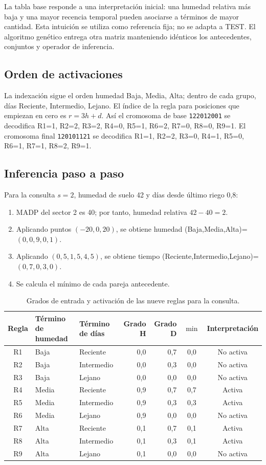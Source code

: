 \documentclass[11pt,letterpaper]{article}
\newcommand{\codigo}[1]{\texttt{\small #1}}
\begin{document}
La tabla base responde a una interpretación inicial: una humedad relativa más baja y una mayor recencia temporal pueden asociarse a términos de mayor cantidad. Esta intuición se utiliza como referencia fija; no se adapta a TEST. El algoritmo genético entrega otra matriz manteniendo idénticos los antecedentes, conjuntos y operador de inferencia.

\subsection{Orden de activaciones}
La indexación sigue el orden humedad Baja, Media, Alta; dentro de cada grupo, días Reciente, Intermedio, Lejano. El índice de la regla para posiciones que empiezan en cero es $r=3h+d$. Así el cromosoma de base \codigo{122012001} se decodifica R1=1, R2=2, R3=2, R4=0, R5=1, R6=2, R7=0, R8=0, R9=1. El cromosoma final \codigo{120101121} se decodifica R1=1, R2=2, R3=0, R4=1, R5=0, R6=1, R7=1, R8=2, R9=1.

\subsection{Inferencia paso a paso}
Para la consulta $s=2$, humedad de suelo 42 y días desde último riego 0,8:
\begin{enumerate}
  \item MADP del sector 2 es 40; por tanto, humedad relativa $42-40=2$.
  \item Aplicando puntos $(-20,0,20)$, se obtiene humedad (Baja,Media,Alta)=$(0,0{,}9,0{,}1)$.
  \item Aplicando $(0{,}5,1{,}5,4{,}5)$, se obtiene tiempo (Reciente,Intermedio,Lejano)=$(0{,}7,0{,}3,0)$.
  \item Se calcula el mínimo de cada pareja antecedente.
\end{enumerate}

\begin{table}[H]
\centering
\caption{Grados de entrada y activación de las nueve reglas para la consulta.}\label{tab:consulta-act}
\begin{tabular}{cllrrcc}
\toprule
Regla & Término de humedad & Término de días & Grado H & Grado D & $\min$ & Interpretación\\
\midrule
R1 & Baja & Reciente & 0,0 & 0,7 & 0,0 & No activa\\
R2 & Baja & Intermedio & 0,0 & 0,3 & 0,0 & No activa\\
R3 & Baja & Lejano & 0,0 & 0,0 & 0,0 & No activa\\
R4 & Media & Reciente & 0,9 & 0,7 & 0,7 & Activa\\
R5 & Media & Intermedio & 0,9 & 0,3 & 0,3 & Activa\\
R6 & Media & Lejano & 0,9 & 0,0 & 0,0 & No activa\\
R7 & Alta & Reciente & 0,1 & 0,7 & 0,1 & Activa\\
R8 & Alta & Intermedio & 0,1 & 0,3 & 0,1 & Activa\\
R9 & Alta & Lejano & 0,1 & 0,0 & 0,0 & No activa\\
\bottomrule
\end{tabular}
\end{table}
\end{document}
